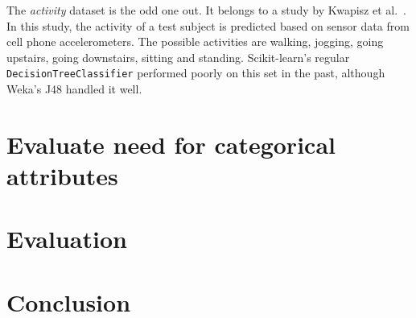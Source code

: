The \emph{activity} dataset is the odd one out. It belongs to a study by Kwapisz et al.~\cite{problematic_dataset}. In this study, the activity of a test subject is predicted based on sensor data from cell phone accelerometers. The possible activities are walking, jogging, going upstairs, going downstairs, sitting and standing. Scikit-learn's regular \texttt{DecisionTreeClassifier} performed poorly on this set in the past, although Weka's J48 handled it well.

\section{Evaluate need for categorical attributes}


\section{Evaluation}


\section{Conclusion}
